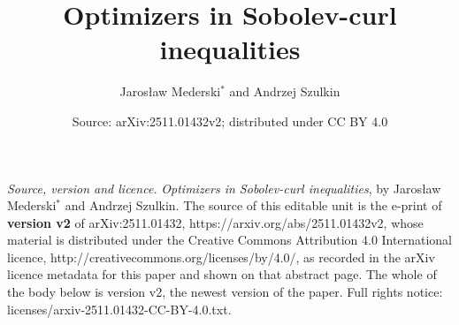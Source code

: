 \documentclass[10pt,a4paper]{amsart}
\numberwithin{equation}{section}
\begin{document}
\title{Optimizers in Sobolev-curl inequalities}
\author{Jaros\l aw Mederski$^{*}$ and Andrzej Szulkin}
\date{Source: arXiv:2511.01432v2; distributed under CC BY 4.0}
\maketitle
\noindent\emph{Source, version and licence.} \emph{Optimizers in Sobolev-curl inequalities}, by Jaros\l aw Mederski$^{*}$ and Andrzej Szulkin. The source of this editable unit is the e-print of \textbf{version v2} of arXiv:2511.01432, https://arxiv.org/abs/2511.01432v2, whose material is distributed under the Creative Commons Attribution 4.0 International licence, http://creativecommons.org/licenses/by/4.0/, as recorded in the arXiv licence metadata for this paper and shown on that abstract page. The whole of the body below is version v2, the newest version of the paper. Full rights notice: licenses/arxiv-2511.01432-CC-BY-4.0.txt.\par\smallskip
\end{document}

